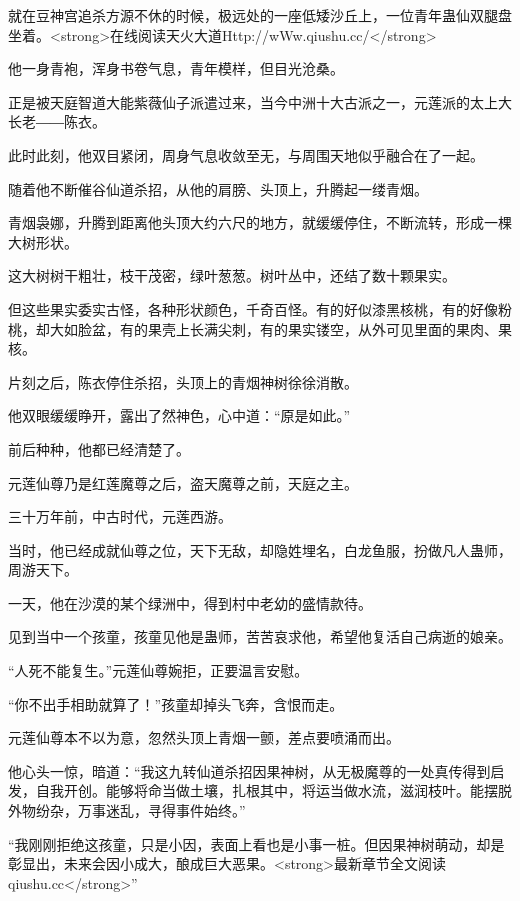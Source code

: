 
\begin{this_body}

就在豆神宫追杀方源不休的时候，极远处的一座低矮沙丘上，一位青年蛊仙双腿盘坐着。<strong>在线阅读天火大道Http://wWw.qiushu.cc/</strong>

他一身青袍，浑身书卷气息，青年模样，但目光沧桑。

正是被天庭智道大能紫薇仙子派遣过来，当今中洲十大古派之一，元莲派的太上大长老――陈衣。

此时此刻，他双目紧闭，周身气息收敛至无，与周围天地似乎融合在了一起。

随着他不断催谷仙道杀招，从他的肩膀、头顶上，升腾起一缕青烟。

青烟袅娜，升腾到距离他头顶大约六尺的地方，就缓缓停住，不断流转，形成一棵大树形状。

这大树树干粗壮，枝干茂密，绿叶葱葱。树叶丛中，还结了数十颗果实。

但这些果实委实古怪，各种形状颜色，千奇百怪。有的好似漆黑核桃，有的好像粉桃，却大如脸盆，有的果壳上长满尖刺，有的果实镂空，从外可见里面的果肉、果核。

片刻之后，陈衣停住杀招，头顶上的青烟神树徐徐消散。

他双眼缓缓睁开，露出了然神色，心中道：“原是如此。”

前后种种，他都已经清楚了。

元莲仙尊乃是红莲魔尊之后，盗天魔尊之前，天庭之主。

三十万年前，中古时代，元莲西游。

当时，他已经成就仙尊之位，天下无敌，却隐姓埋名，白龙鱼服，扮做凡人蛊师，周游天下。

一天，他在沙漠的某个绿洲中，得到村中老幼的盛情款待。

见到当中一个孩童，孩童见他是蛊师，苦苦哀求他，希望他复活自己病逝的娘亲。

“人死不能复生。”元莲仙尊婉拒，正要温言安慰。

“你不出手相助就算了！”孩童却掉头飞奔，含恨而走。

元莲仙尊本不以为意，忽然头顶上青烟一颤，差点要喷涌而出。

他心头一惊，暗道：“我这九转仙道杀招因果神树，从无极魔尊的一处真传得到启发，自我开创。能够将命当做土壤，扎根其中，将运当做水流，滋润枝叶。能摆脱外物纷杂，万事迷乱，寻得事件始终。”

“我刚刚拒绝这孩童，只是小因，表面上看也是小事一桩。但因果神树萌动，却是彰显出，未来会因小成大，酿成巨大恶果。<strong>最新章节全文阅读qiushu.cc</strong>”


\end{this_body}
